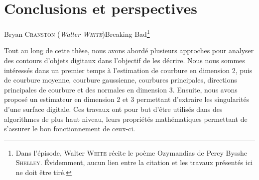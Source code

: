 %
%
%
\chapter{Conclusions et perspectives}
\label{sec:conclusion}

 {Bryan \textsc{Cranston} (\emph{Walter \textsc{White}})}{Breaking
Bad}\footnote{Dans l'épisode, Walter \textsc{White} récite le poème Ozymandias
de Percy Bysshe \textsc{Shelley}. Évidemment, aucun lien entre la citation et
les travaux présentés ici ne doit être tiré.}

Tout au long de cette thèse, nous avons abordé plusieurs approches pour analyser
des contours d'objets digitaux dans l'objectif de les décrire. Nous nous sommes
intéressés dans un premier temps à l'estimation de courbure en dimension 2, puis
de courbure moyenne, courbure gaussienne, courbures
principales, directions principales de courbure et des normales en dimension
3. Ensuite, nous avons proposé un estimateur en dimension 2 et 3 permettant
d'extraire les singularités d'une surface digitale. Ces travaux ont pour but
d'être utilisés dans des algorithmes de plus haut niveau, leurs  propriétés
mathématiques permettant de s'assurer le bon fonctionnement de ceux-ci.


